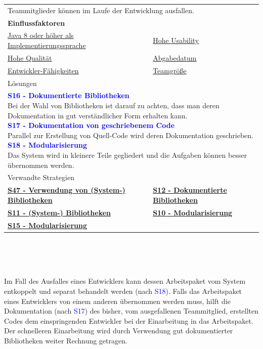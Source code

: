 \documentclass[enabledeprecatedfontcommands,fontsize=11pt,paper=a4,twoside]{scrartcl}
\newcounter{one}
\newcommand{\cb}[1]{{\textcolor{blue}{#1}}}
\begin{document}
	\begin{tabular} {|p{8cm} p{8cm}|}
		\hline
		\rowcolor{prob}\multicolumn{2}{|l|}{\parbox{16cm}{\textbf{06: Ausfallende Entwickler}}} \\  \hline\hline 
		\multicolumn{2}{|l|}{\parbox{16cm}{Teammitglieder können im Laufe der Entwicklung ausfallen.}}\rule{0pt}{1ex}\\ \hline
		\multicolumn{2}{|l|}{\textbf{Einflussfaktoren}}\\
		\hyperlink{b}{Java 8 oder höher als Implementierungssprache} &
		\hyperlink {g}{Hohe Usability}\\
		\hyperlink {h}{Hohe Qualität}&
		\hyperlink {uu}{Abgabedatum} \\
		\hyperlink {vv}{Entwickler-Fähigkeiten} &
		\hyperlink {xx}{Teamgröße} 
		\\ \hline
		\multicolumn{2}{|l|}{Lösungen} \\
		\multicolumn{2}{|l|}{\parbox{16cm}{
				\textbf{\cb{\hypertarget{ddd}{S16 - Dokumentierte Bibliotheken}}}\\
				Bei der Wahl von Bibliotheken ist darauf zu achten, dass man deren Dokumentation in gut verständlicher Form erhalten kann. \\
				\textbf{\cb{\hypertarget{dokuvongeschriebenemcode}{S17 - Dokumentation von geschriebenem Code}}}\\
				Parallel zur Erstellung von Quell-Code wird deren Dokumentation geschrieben.\\
				\textbf{\cb{\hypertarget{aacc}{S18 - Modularisierung}}} \\
				Das System wird in kleinere Teile gegliedert und die Aufgaben können besser übernommen werden.
		}}\\ [4ex] \hline
		\multicolumn{2}{|l|}{Verwandte Strategien} \\
		\textbf{\hyperlink {qqq}{S47 - Verwendung von (System-) Bibliotheken}} & 
		\textbf{\hyperlink {aaaf}{S12 - Dokumentierte Bibliotheken}} \\
		\textbf{\hyperlink {ccc}{S11 - (System-) Bibliotheken}} &
		\textbf{\hyperlink{aadd}{S10 - Modularisierung}}\\
		\textbf{\hyperlink{aabb}{S15 - Modularisierung}} &
		\\\hline
	\end{tabular}\\ \\ \\
	\begin{onehalfspace}
		Im Fall des Ausfalles eines Entwicklers kann dessen Arbeitspaket vom System entkoppelt und separat behandelt werden (nach \cb{S18}). Falls das Arbeitspaket eines Entwicklers von einem anderen übernommen werden muss, hilft die Dokumentation (nach \cb{S17}) des bisher, vom ausgefallenen Teammitglied, erstellten Codes dem einspringenden Entwickler bei der Einarbeitung in das Arbeitspaket. Der schnelleren Einarbeitung wird durch Verwendung gut dokumentierter Bibliotheken weiter Rechnung getragen.
	\end{onehalfspace}
\end{document}
